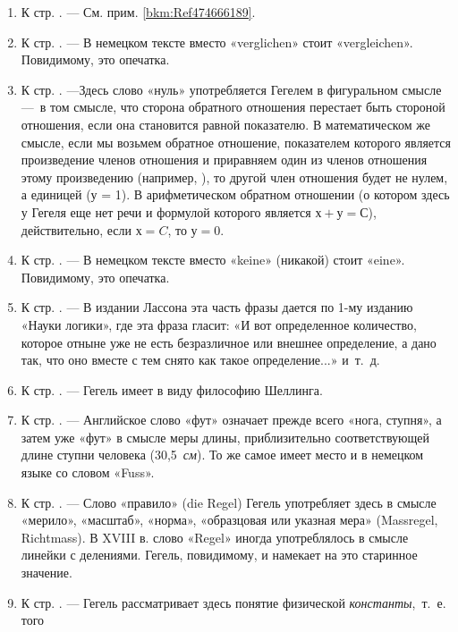 \begin{enumerate}
\item \label{bkm:Ref474666244}К стр. \pageref{bkm:bm54}. — См. прим.
\ref{bkm:Ref474666189}.
\item \label{bkm:Ref474666256}К стр. \pageref{bkm:bm55}. — В немецком тексте
вместо «verglichen» стоит «vergleichen». Повидимому, это опечатка.
\item \label{bkm:Ref474666305}К стр. \pageref{bkm:bm56}. —Здесь слово «нуль»
употребляется Гегелем в фигуральном смысле —~в том смысле, что сторона
обратного отношения перестает быть стороной отношения, если она становится
равной показателю. В математическом же смысле, если мы возьмем обратное
отношение, показателем которого является произведение членов отношения  и
приравняем один из членов отношения этому произведению (например, ), то
другой член отношения будет не нулем, а единицей (у = 1). В арифметическом
обратном отношении (о котором здесь у Гегеля еще нет речи и формулой
которого является $х+у=С$), действительно, если $х=C$,
то $у=0$.
\item \label{bkm:Ref474666541}К стр. \pageref{bkm:bm57}. — В немецком тексте
вместо «keine» (никакой) стоит «eine». Повидимому, это опечатка.
\item \label{bkm:Ref474666560}К стр. \pageref{bkm:bm58}. — В издании Лассона
эта часть фразы дается по 1-му изданию «Науки логики», где эта фраза
гласит: «И вот определенное количество, которое отныне уже не есть
безразличное или внешнее определение, а дано так, что оно вместе с тем
снято как такое определение...» и~т.~д.
\item \label{bkm:Ref474666566}К стр. \pageref{bkm:bm59}. — Гегель имеет в
виду философию Шеллинга.
\item \label{bkm:Ref474666577}К стр. \pageref{bkm:bm60}. — Английское слово
«фут» означает прежде всего «нога, ступня», а затем уже «фут» в смысле меры
длины, приблизительно соответствующей длине ступни человека
(30,5~{\em см}). То же самое имеет место и в немецком языке со словом
«Fuss».
\item \label{bkm:Ref474666643}К стр. \pageref{bkm:bm61}. — Слово «правило»
(die Regel) Гегель употребляет здесь в смысле «мерило», «масштаб», «норма»,
«образцовая или указная мера» (Massregel, Richtmass). В XVIII в. слово
«Regel» иногда употреблялось в смысле линейки с делениями. Гегель,
повидимому, и намекает на это старинное значение.
\item \label{bkm:Ref474666655}К стр. \pageref{bkm:bm62}. — Гегель
рассматривает здесь понятие физической {\em константы},~т.~е. того

\end{enumerate}
